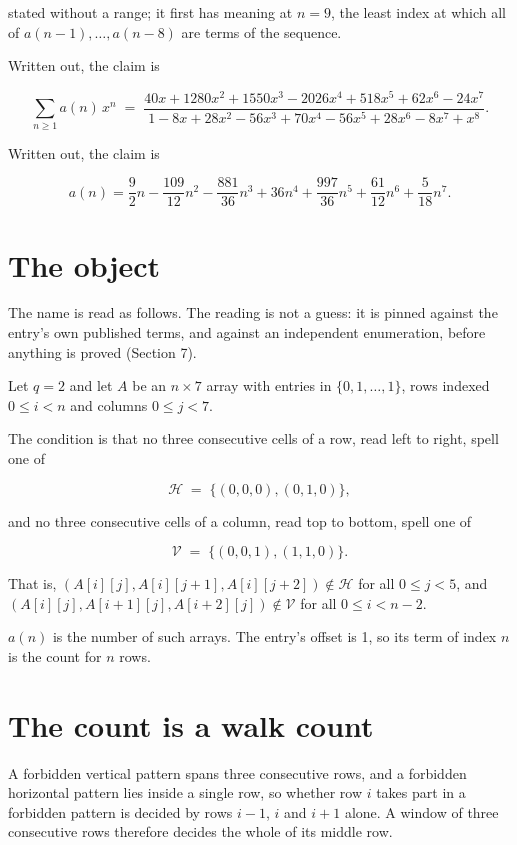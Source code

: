 \documentclass[11pt]{article}
\theoremstyle{definition}
\begin{document}
stated without a range; it first has meaning at $n = 9$, the least index at which all of $a(n-1),\dots,a(n-8)$ are terms of the sequence.

Written out, the claim is

\[\sum_{n \ge 1} a(n)\,x^n \;=\; \frac{40x + 1280x^{2} + 1550x^{3} - 2026x^{4} + 518x^{5} + 62x^{6} - 24x^{7}}{1 - 8x + 28x^{2} - 56x^{3} + 70x^{4} - 56x^{5} + 28x^{6} - 8x^{7} + x^{8}}.\]

Written out, the claim is

\[a(n) = \frac{9}{2}n - \frac{109}{12}n^{2} - \frac{881}{36}n^{3} + 36n^{4} + \frac{997}{36}n^{5} + \frac{61}{12}n^{6} + \frac{5}{18}n^{7}.\]

\section{The object}

The name is read as follows. The reading is not a guess: it is pinned against the entry's own published terms, and against an independent enumeration, before anything is proved (Section 7).

Let $q = 2$ and let $A$ be an $n \times 7$ array with entries in $\{0,1,\dots,1\}$, rows indexed $0 \le i < n$ and columns $0 \le j < 7$.

The condition is that no three consecutive cells of a row, read left to right, spell one of

\[\mathcal{H} \;=\; \{(0,0,0), (0,1,0)\},\]

and no three consecutive cells of a column, read top to bottom, spell one of

\[\mathcal{V} \;=\; \{(0,0,1), (1,1,0)\}.\]

That is, $(A[i][j],A[i][j{+}1],A[i][j{+}2]) \notin \mathcal{H}$ for all $0 \le j < 5$, and $(A[i][j],A[i{+}1][j],A[i{+}2][j]) \notin \mathcal{V}$ for all $0 \le i < n-2$.

$a(n)$ is the number of such arrays. The entry's offset is 1, so its term of index $n$ is the count for $n$ rows.

\section{The count is a walk count}

A forbidden vertical pattern spans three consecutive rows, and a forbidden horizontal pattern lies inside a single row, so whether row $i$ takes part in a forbidden pattern is decided by rows $i-1$, $i$ and $i+1$ alone. A window of three consecutive rows therefore decides the whole of its middle row.
\end{document}
